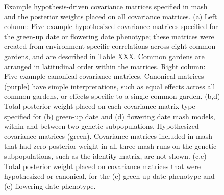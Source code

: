\documentclass[
  9pt,
  twocolumn,
  twoside]{pnas-new}
\begin{document}
\begin{figure}


\caption{\label{fig-covar}Example hypothesis-driven covariance matrices
specified in mash and the posterior weights placed on all covariance
matrices. (a) Left column: Five example hypothesized covariance matrices
specified for the green-up date or flowering date phenotype; these
matrices were created from environment-specific correlations across
eight common gardens, and are described in Table XXX. Common gardens are
arranged in latitudinal order within the matrices. Right column: Five
example canonical covariance matrices. Canonical matrices (purple) have
simple interpretations, such as equal effects across all common gardens,
or effects specific to a single common garden. (b,d) Total posterior
weight placed on each covariance matrix type specified for (b) green-up
date and (d) flowering date mash models, within and between two genetic
subpopulations. Hypothesized covariance matrices (green). Covariance
matrices included in mash that had zero posterior weight in all three
mash runs on the genetic subpopulations, such as the identity matrix,
are not shown. (c,e) Total posterior weight placed on covariance
matrices that were hypothesized or canonical, for the (c) green-up date
phenotype and (e) flowering date phenotype.}

\end{figure}%
\end{document}
